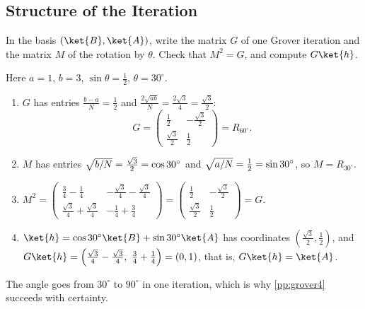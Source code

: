 \subsection{Structure of the Iteration}

\begin{exercisebox}
\begin{pproblem}[The rotation for $N = 4$, $a = 1$]\label{wp:rot4}
    In the basis $(\ket{B}, \ket{A})$, write the matrix $G$ of one Grover iteration and the matrix
    $M$ of the rotation by $\theta$. Check that $M^2 = G$, and compute $G\ket{h}$.
\end{pproblem}
\tcblower
\begin{wsolution}
    Here $a = 1$, $b = 3$, $\sin\theta = \frac{1}{2}$, $\theta = 30^\circ$.
    \begin{enumerate}
        \item $G$ has entries $\frac{b - a}{N} = \frac{1}{2}$ and
              $\frac{2\sqrt{ab}}{N} = \frac{2\sqrt{3}}{4} = \frac{\sqrt{3}}{2}$:
              \[G = \begin{pmatrix} \tfrac{1}{2} & -\tfrac{\sqrt{3}}{2} \\[0.5ex] \tfrac{\sqrt{3}}{2} & \tfrac{1}{2} \end{pmatrix} = R_{60^\circ}.\]
        \item $M$ has entries $\sqrt{b/N} = \frac{\sqrt{3}}{2} = \cos 30^\circ$ and
              $\sqrt{a/N} = \frac{1}{2} = \sin 30^\circ$, so $M = R_{30^\circ}$.
        \item $M^2 = \begin{pmatrix} \tfrac{3}{4} - \tfrac{1}{4} & -\tfrac{\sqrt{3}}{4} - \tfrac{\sqrt{3}}{4} \\[0.5ex] \tfrac{\sqrt{3}}{4} + \tfrac{\sqrt{3}}{4} & -\tfrac{1}{4} + \tfrac{3}{4} \end{pmatrix}
                  = \begin{pmatrix} \tfrac{1}{2} & -\tfrac{\sqrt{3}}{2} \\[0.5ex] \tfrac{\sqrt{3}}{2} & \tfrac{1}{2} \end{pmatrix} = G$.
        \item $\ket{h} = \cos 30^\circ \ket{B} + \sin 30^\circ \ket{A}$ has coordinates
              $\left(\frac{\sqrt{3}}{2}, \frac{1}{2}\right)$, and
              $G\ket{h} = \left(\frac{\sqrt{3}}{4} - \frac{\sqrt{3}}{4},\ \frac{3}{4} + \frac{1}{4}\right) = (0, 1)$,
              that is, $G\ket{h} = \ket{A}$.
    \end{enumerate}
    The angle goes from $30^\circ$ to $90^\circ$ in one iteration, which is why
    \cref{pp:grover4} succeeds with certainty.
\end{wsolution}
\end{exercisebox}

